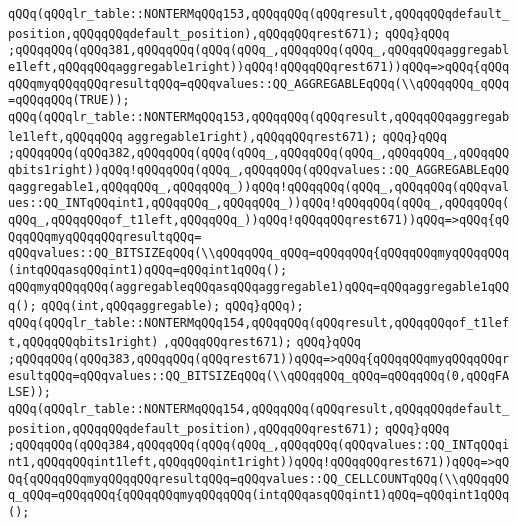 \verb|qQQq(qQQqlr_table::NONTERMqQQq153,qQQqqQQq(qQQqresult,qQQqqQQqdefault_position,qQQqqQQqdefault_position),qQQqqQQqrest671);|\newline
\verb|qQQq}qQQq|\newline
\verb|;qQQqqQQq(qQQq381,qQQqqQQq(qQQq(qQQq_,qQQqqQQq(qQQq_,qQQqqQQqaggregable1left,qQQqqQQqaggregable1right))qQQq!qQQqqQQqrest671))qQQq=>qQQq{qQQqqQQqmyqQQqqQQqresultqQQq=qQQqvalues::QQ_AGGREGABLEqQQq(\\qQQqqQQq_qQQq=qQQqqQQq(TRUE));|\newline
\verb|qQQq(qQQqlr_table::NONTERMqQQq153,qQQqqQQq(qQQqresult,qQQqqQQqaggregable1left,qQQqqQQq|\newline
\verb|aggregable1right),qQQqqQQqrest671);|\newline
\verb|qQQq}qQQq|\newline
\verb|;qQQqqQQq(qQQq382,qQQqqQQq(qQQq(qQQq_,qQQqqQQq(qQQq_,qQQqqQQq_,qQQqqQQqbits1right))qQQq!qQQqqQQq(qQQq_,qQQqqQQq(qQQqvalues::QQ_AGGREGABLEqQQqaggregable1,qQQqqQQq_,qQQqqQQq_))qQQq!qQQqqQQq(qQQq_,qQQqqQQq(qQQqvalues::QQ_INTqQQqint1,qQQqqQQq_,qQQqqQQq_))qQQq!qQQqqQQq(qQQq_,qQQqqQQq(qQQq_,qQQqqQQqof_t1left,qQQqqQQq_))qQQq!qQQqqQQqrest671))qQQq=>qQQq{qQQqqQQqmyqQQqqQQqresultqQQq=|\newline
\verb|qQQqvalues::QQ_BITSIZEqQQq(\\qQQqqQQq_qQQq=qQQqqQQq{qQQqqQQqmyqQQqqQQq(intqQQqasqQQqint1)qQQq=qQQqint1qQQq();|\newline
\verb|qQQqmyqQQqqQQq(aggregableqQQqasqQQqaggregable1)qQQq=qQQqaggregable1qQQq();|\newline
\verb|qQQq(int,qQQqaggregable);|\newline
\verb|qQQq}qQQq);|\newline
\verb|qQQq(qQQqlr_table::NONTERMqQQq154,qQQqqQQq(qQQqresult,qQQqqQQqof_t1left,qQQqqQQqbits1right)|\newline
\verb|,qQQqqQQqrest671);|\newline
\verb|qQQq}qQQq|\newline
\verb|;qQQqqQQq(qQQq383,qQQqqQQq(qQQqrest671))qQQq=>qQQq{qQQqqQQqmyqQQqqQQqresultqQQq=qQQqvalues::QQ_BITSIZEqQQq(\\qQQqqQQq_qQQq=qQQqqQQq(0,qQQqFALSE));|\newline
\verb|qQQq(qQQqlr_table::NONTERMqQQq154,qQQqqQQq(qQQqresult,qQQqqQQqdefault_position,qQQqqQQqdefault_position),qQQqqQQqrest671);|\newline
\verb|qQQq}qQQq|\newline
\verb|;qQQqqQQq(qQQq384,qQQqqQQq(qQQq(qQQq_,qQQqqQQq(qQQqvalues::QQ_INTqQQqint1,qQQqqQQqint1left,qQQqqQQqint1right))qQQq!qQQqqQQqrest671))qQQq=>qQQq{qQQqqQQqmyqQQqqQQqresultqQQq=qQQqvalues::QQ_CELLCOUNTqQQq(\\qQQqqQQq_qQQq=qQQqqQQq{qQQqqQQqmyqQQqqQQq(intqQQqasqQQqint1)qQQq=qQQqint1qQQq();|\newline
